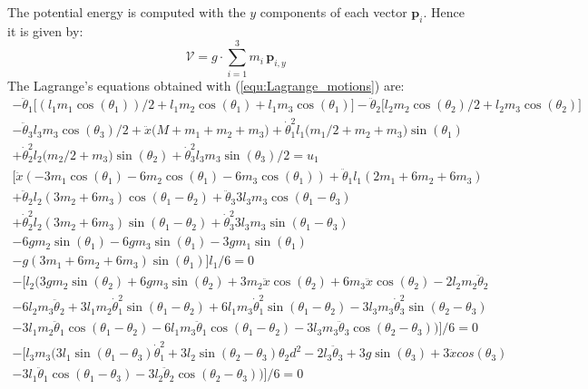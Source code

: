 \documentclass[a4paper,12pt,twoside]{article}
\begin{document}
The potential energy is computed with the $y$ components of each vector $\mathbf{p}_i$. Hence it is given by:
\begin{equation}
	\mathcal{V} = g \cdot \sum_{i=1}^3 m_i\, \mathbf{p}_{i,y}
\end{equation}
The Lagrange's equations obtained with (\ref{equ:Lagrange_motions}) are:
\begin{multline}
- \ddot\theta_1 \big[(l_1 m_1 \cos( \theta_1))/2 + l_1 m_2 \cos(\theta_1) + l_1 m_3 \cos(\theta_1)\big] - \ddot \theta_2 \big[l_2 m_2 \cos(\theta_2)/2 + l_2 m_3 \cos(\theta_2)\big] \\
- \ddot\theta_3 l_3 m_3 \cos(\theta_3)/2 + \ddot x \big(M + m_1 + m_2 + m_3\big) + \dot\theta_1^2 l_1 \big( m_1/2 + m_2 + m_3 \big)\sin(\theta_1) \\
+ \dot \theta_2^2 l_2\big(m_2/2 + m_3\big)\sin(\theta_2) +\dot \theta_3^2 l_3 m_3 \sin(\theta_3)/2 = u_1
\end{multline}
\begin{multline}
\big[\ddot x\left( -3m_1\cos(\theta_1) - 6m_2\cos(\theta_1) - 6m_3\cos(\theta_1) \right) +\ddot\theta_1 l_1\left( 2m_1 + 6m_2 + 6m_3 \right) \\
+ \ddot\theta_2 l_2 \left(3m_2 + 6m_3\right) \cos(\theta_1 - \theta_2) + \ddot\theta_3 3l_3m_3\cos(\theta_1 - \theta_3) \\
+\dot\theta_2^2 l_2 (3m_2 + 6m_3) \sin(\theta_1-\theta_2) + \dot\theta_3^2 3 l_3m_3 \sin(\theta_1-\theta_3)\\
- 6 g m_2 \sin(\theta_1) - 6 g m_3 \sin(\theta_1) - 3 g m_1 \sin(\theta_1)\\
- g (3m_1+6m_2+6m_3) \sin(\theta_1) \big] l_1/6 = 0
\end{multline}
\begin{multline}
-\big[l_2 (3 g m_2  \sin(\theta_2) + 6 g m_3  \sin(\theta_2) + 3 m_2 \ddot x  \cos(\theta_2) + 6 m_3 \ddot x  \cos(\theta_2) - 2 l_2 m_2 \ddot \theta_2 \\
- 6 l_2 m_3 \ddot \theta_2 + 3 l_1 m_2 \dot \theta_1^2  \sin(\theta_1 - \theta_2) + 6 l_1 m_3 \dot \theta_1^2  \sin(\theta_1 - \theta_2) - 3 l_3 m_3 \dot \theta_3^2  \sin(\theta_2 - \theta_3) \\
- 3 l_1 m_2 \ddot \theta_1  \cos(\theta_1 - \theta_2) - 6 l_1 m_3 \ddot \theta_1  \cos(\theta_1 - \theta_2) - 3 l_3 m_3 \ddot \theta_3  \cos(\theta_2 - \theta_3))\big]/6 = 0
\end{multline}
\begin{multline}
-\big[l_3 m_3 (3 l_1 \sin(\theta_1 - \theta_3) \dot\theta_1^2 + 3 l_2 \sin(\theta_2 - \theta_3) \theta_2d^2 - 2 l_3 \ddot\theta_3 + 3 g \sin(\theta_3) + 3 \ddot x cos(\theta_3) \\
- 3 l_1 \ddot\theta_1 \cos(\theta_1 - \theta_3) - 3 l_2 \ddot\theta_2 \cos(\theta_2 - \theta_3))\big]/6 = 0
\end{multline}
\end{document}
